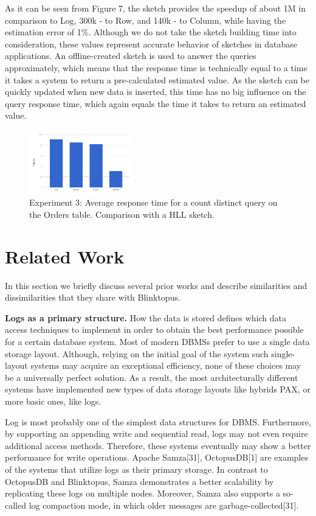 \documentclass[10pt, conference, compsocconf]{IEEEtran}
\begin{document}
As it can be seen from Figure 7, the sketch provides the speedup of about 1M in comparison to Log, 300k - to Row, and 140k - to Column, while having the estimation error of 1\%. Although we do not take the sketch building time into consideration, these values represent accurate behavior of sketches in database applications. An offline-created sketch is used to answer the queries approximately, which means that the response time is technically equal to a time it takes a system to return a pre-calculated estimated value. As the sketch can be quickly updated when new data is inserted, this time has no big influence on the query response time, which again equals the time it takes to return an estimated value.

\begin{figure} \includegraphics[width=0.4\textwidth, center]{img/exp3.png} 
\caption{Experiment 3: Average response time for a count distinct query on the Orders table. Comparison with a HLL sketch.}
\end{figure}

\section{Related Work}
In this section we briefly discuss several prior works and describe similarities and dissimilarities that they share with Blinktopus.

\textbf{Logs as a primary structure.} How the data is stored defines which data access techniques to implement in order to obtain the best performance possible for a certain database system. Most of modern DBMSs prefer to use a single data storage layout. Although, relying on the initial goal of the system such single-layout systems may acquire an exceptional efficiency, none of these choices may be a universally perfect solution. As a result, the most architecturally different systems have implemented new types of data storage layouts like hybrids PAX, or more basic ones, like logs. 

Log is most probably one of the simplest data structures for DBMS. Furthermore, by supporting an appending write and sequential read, logs may not even require additional access methods. Therefore, these systems eventually may show a better performance for write operations. Apache Samza[31], OctopusDB[1] are examples of the systems that utilize logs as their primary storage. In contrast to OctopusDB and Blinktopus, Samza demonstrates a better scalability by replicating these logs on multiple nodes. Moreover, Samza also supports a so-called log compaction mode, in which older messages are garbage-collected[31].
\end{document}
